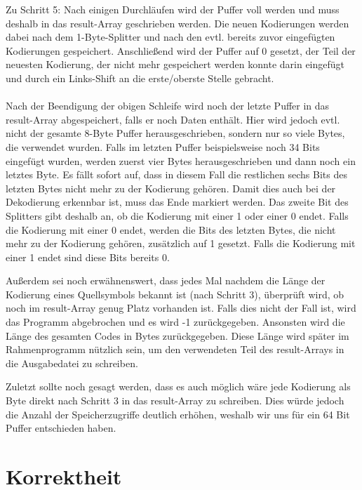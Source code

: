 \documentclass[course=erap]{aspdoc}
\begin{document}
Zu Schritt 5: Nach einigen Durchläufen wird der Puffer voll werden und muss deshalb in das result-Array geschrieben werden. Die neuen Kodierungen werden dabei nach dem 1-Byte-Splitter und nach den evtl. bereits zuvor eingefügten Kodierungen gespeichert. Anschließend wird der Puffer auf 0 gesetzt, der Teil der neuesten Kodierung, der nicht mehr gespeichert werden konnte darin eingefügt und durch ein Links-Shift an die erste/oberste Stelle gebracht.\\\\
Nach der Beendigung der obigen Schleife wird noch der letzte Puffer in das result-Array abgespeichert, falls er noch Daten enthält. Hier wird jedoch evtl. nicht der gesamte 8-Byte Puffer herausgeschrieben, sondern nur so viele Bytes, die verwendet wurden. Falls im letzten Puffer beispielsweise noch 34 Bits eingefügt wurden, werden zuerst vier Bytes herausgeschrieben und dann noch ein letztes Byte. Es fällt sofort auf, dass in diesem Fall die restlichen sechs Bits des letzten Bytes nicht mehr zu der Kodierung gehören. Damit dies auch bei der Dekodierung erkennbar ist, muss das Ende markiert werden. Das zweite Bit des Splitters gibt deshalb an, ob die Kodierung mit einer 1 oder einer 0 endet. Falls die Kodierung mit einer 0 endet, werden die Bits des letzten Bytes, die nicht mehr zu der Kodierung gehören, zusätzlich auf 1 gesetzt. Falls die Kodierung mit einer 1 endet sind diese Bits bereits 0.    

Außerdem sei noch erwähnenswert, dass jedes Mal nachdem die Länge der Kodierung eines Quellsymbols bekannt ist (nach Schritt 3), überprüft wird, ob noch im result-Array genug Platz vorhanden ist. Falls dies nicht der Fall ist, wird das Programm abgebrochen und es wird -1 zurückgegeben. Ansonsten wird die Länge des gesamten Codes in Bytes zurückgegeben.
Diese Länge wird später im Rahmenprogramm nützlich sein, um den verwendeten Teil des result-Arrays in die Ausgabedatei zu schreiben.


Zuletzt sollte noch gesagt werden, dass es auch möglich wäre jede Kodierung als Byte direkt nach Schritt 3 in das result-Array zu schreiben. Dies würde jedoch die Anzahl der Speicherzugriffe deutlich erhöhen, weshalb wir uns für ein 64 Bit Puffer entschieden haben. 




\section{Korrektheit}
\end{document}
